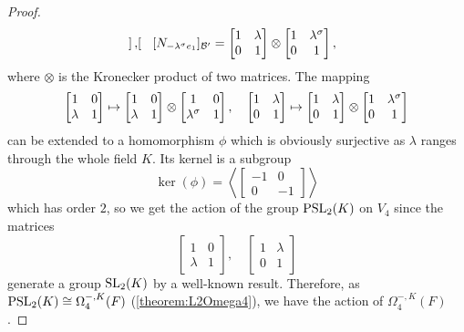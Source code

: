 \begin{proof}
\begin{equation*}
\begin{bmatrix}
		\end{bmatrix},\quad
		[N_{-\lambda^{\sigma} e_1}]_{\mathcal{B}'} = \begin{bmatrix}
			1 & \lambda \\
			0 & 1
		\end{bmatrix} \otimes
		\begin{bmatrix}
			1 & \lambda^{\sigma} \\
			0 & 1
		\end{bmatrix},
	\end{equation*}
	where $\otimes$ is the Kronecker product of two matrices. The mapping
	\begin{equation*}
		\begin{bmatrix}
			1 & 0 \\
			\lambda & 1 
		\end{bmatrix} \mapsto
		\begin{bmatrix}
			1 & 0 \\
			\lambda & 1
		\end{bmatrix} \otimes
		\begin{bmatrix}
			1 & 0 \\
			\lambda^{\sigma} & 1
		\end{bmatrix},\quad 
		\begin{bmatrix}
			1 & \lambda \\
			0 & 1
		\end{bmatrix} \mapsto
		\begin{bmatrix}
			1 & \lambda \\
			0 & 1
		\end{bmatrix} \otimes
		\begin{bmatrix}
			1 & \lambda^{\sigma} \\
			0 & 1
		\end{bmatrix}
	\end{equation*}
	can be extended to a homomorphism $\phi$ which is obviously surjective as $\lambda$
	 ranges
	through the whole field $K$. Its kernel is a subgroup
	\begin{equation*}
		\ker(\phi) = 
		\left\langle
			\begin{bmatrix}
				-1 & 0 \\
				0 & -1
			\end{bmatrix}
		\right\rangle
	\end{equation*}
	which has order $2$, so we get the action of the group $\mathrm{PSL}_2(K)$ on $V_4$ since
	the matrices
	\begin{equation*}
		\begin{bmatrix}
			1 & 0 \\
			\lambda & 1
		\end{bmatrix},\quad
		\begin{bmatrix}
			1 & \lambda \\
			0 & 1 
		\end{bmatrix}
	\end{equation*}
	generate a group $\mathrm{SL}_2(K)$ by a well-known result.
	Therefore, as $\mathrm{PSL}_2(K) \cong \Omega_4^{-,K}(F)$ (\ref{theorem:L2Omega4}), 
	we have the action of $\Omega_4^{-,K}(F)$. 
\end{proof}

